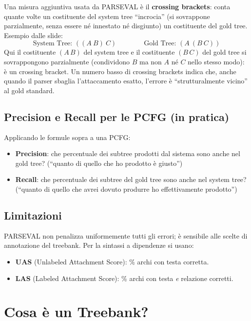 \documentclass[12pt,a4paper]{article}
\begin{document}
Una misura aggiuntiva usata da PARSEVAL è il \textbf{crossing brackets}: conta quante volte un costituente del system tree ``incrocia'' (si sovrappone parzialmente, senza essere né innestato né disgiunto) un costituente del gold tree. Esempio dalle slide:
\[
\text{System Tree: } ((A\ B)\ C) \qquad\qquad \text{Gold Tree: } (A\ (B\ C))
\]
Qui il costituente $(A\,B)$ del system tree e il costituente $(B\,C)$ del gold tree si sovrappongono parzialmente (condividono $B$ ma non $A$ né $C$ nello stesso modo): è un crossing bracket. Un numero basso di crossing brackets indica che, anche quando il parser sbaglia l'attaccamento esatto, l'errore è ``strutturalmente vicino'' al gold standard.

\subsection{Precision e Recall per le PCFG (in pratica)}

Applicando le formule sopra a una PCFG:
\begin{itemize}[leftmargin=1.5em]
  \item \textbf{Precision}: che percentuale dei subtree prodotti dal sistema sono anche nel gold tree? (``quanto di quello che ho prodotto è giusto'')
  \item \textbf{Recall}: che percentuale dei subtree del gold tree sono anche nel system tree? (``quanto di quello che avrei dovuto produrre ho effettivamente prodotto'')
\end{itemize}

\subsection{Limitazioni}

PARSEVAL non penalizza uniformemente tutti gli errori; è sensibile alle scelte di annotazione del treebank. Per la sintassi a dipendenze si usano:
\begin{itemize}[leftmargin=1.5em]
  \item \textbf{UAS} (Unlabeled Attachment Score): \% archi con testa corretta.
  \item \textbf{LAS} (Labeled Attachment Score): \% archi con testa \emph{e} relazione corretti.
\end{itemize}

\section{Cosa è un Treebank?}
\end{document}
